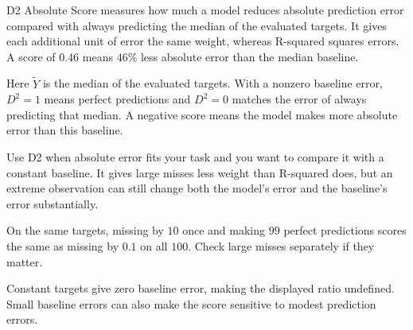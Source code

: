 D2 Absolute Score measures how much a model reduces absolute prediction error compared with always predicting the median of the evaluated targets. It gives each additional unit of error the same weight, whereas R-squared squares errors. A score of $0.46$ means $46\%$ less absolute error than the median baseline.

\begin{metricformula}
\end{metricformula}

Here $\tilde{Y}$ is the median of the evaluated targets. With a nonzero baseline error, $D^2=1$ means perfect predictions and $D^2=0$ matches the error of always predicting that median. A negative score means the model makes more absolute error than this baseline.


Use D2 when absolute error fits your task and you want to compare it with a constant baseline. It gives large misses less weight than R-squared does, but an extreme observation can still change both the model's error and the baseline's error substantially.

{
    \item On the same targets, missing by $10$ once and making $99$ perfect predictions scores the same as missing by $0.1$ on all $100$. Check large misses separately if they matter.
    \item Constant targets give zero baseline error, making the displayed ratio undefined. Small baseline errors can also make the score sensitive to modest prediction errors.
}


